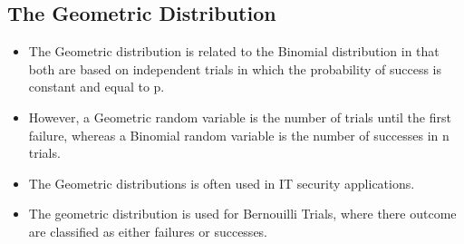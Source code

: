 \documentclass[]{report}
\begin{document}
\subsection{The Geometric Distribution }

	\begin{itemize}
		\item The Geometric distribution is related to the Binomial distribution in that
		both are based on independent trials in which the probability of success
		is constant and equal to p.
		\item However, a Geometric random variable is the number of trials until the
		first failure, whereas a Binomial random variable is the number of
		successes in n trials.
		\item The Geometric distributions is often used in IT security applications.
	\end{itemize}


\begin{itemize}
	\item The geometric distribution is used for Bernouilli Trials, where there outcome are classified as either failures or successes.
\end{itemize} \bigskip
\end{document}
